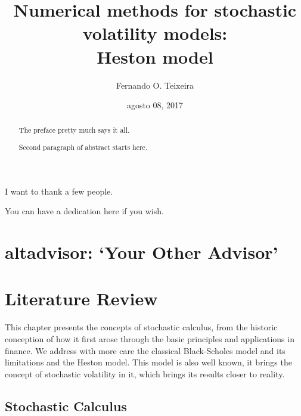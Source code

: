 \documentclass[12pt,twoside]{reedthesis}
\title{\textbf{\Huge{Numerical methods for stochastic volatility models: \\[20pt] Heston model}}}
\author{Fernando O. Teixeira}
\date{agosto 08, 2017}
\theoremstyle{definition}
\theoremstyle{definition}
\theoremstyle{remark}
\begin{document}
      \maketitle
  
  \frontmatter %
  \pagestyle{empty} %
      \begin{acknowledgements}
      I want to thank a few people.
    \end{acknowledgements}
  
      \hypersetup{linkcolor=black}
    \setcounter{tocdepth}{2}
    \tableofcontents
  
      \listoftables
  
      \listoffigures
      \begin{abstract}
      The preface pretty much says it all. \par  Second paragraph of abstract
      starts here.
    \end{abstract}
      \begin{dedication}
      You can have a dedication here if you wish.
    \end{dedication}
  \mainmatter %
  \pagestyle{fancyplain} %

  \chapter{\texorpdfstring{altadvisor: `Your Other
  Advisor'}{altadvisor: Your Other Advisor}}\label{altadvisor-your-other-advisor}
  
  \chapter{Literature Review}\label{lt-review}
  
  This chapter presents the concepts of stochastic calculus, from the
  historic conception of how it first arose through the basic principles
  and applications in finance. We address with more care the classical
  Black-Scholes model and its limitations and the Heston model. This model
  is also well known, it brings the concept of stochastic volatility in
  it, which brings its results closer to reality.
  
  \section{Stochastic Calculus}\label{stochastic-calculus}
  
\end{document}
